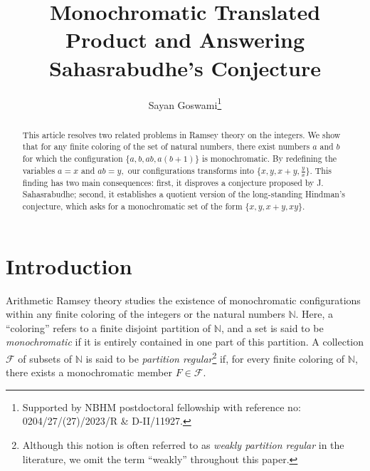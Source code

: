 \documentclass{aic}
\begin{document}
\begin{frontmatter}[classification=text]

\title{Monochromatic Translated Product and Answering Sahasrabudhe's Conjecture} %

\author[SG]{Sayan Goswami\thanks{Supported by  NBHM postdoctoral fellowship with reference no: 0204/27/(27)/2023/R \& D-II/11927.}}

\begin{abstract}
This article resolves two related problems in Ramsey theory on the integers. We show that for any finite coloring of the set of natural numbers, there exist numbers $a$ and $b$ for which the configuration $\{a, b, ab, a(b+1)\}$ is monochromatic. By redefining the variables $a=x$ and $ab=y,$ our configurations transforms into $\{x,y,x+y,\frac{y}{x}\}.$ This finding has two main consequences: first, it disproves a conjecture proposed by J. Sahasrabudhe; second, it establishes a quotient version of the long-standing Hindman's conjecture, which asks for a monochromatic set of the form $\{x,y,x+y,xy\}$. 
\end{abstract}
\end{frontmatter}

\section{Introduction}


Arithmetic Ramsey theory studies the existence of monochromatic configurations within any finite coloring of the integers or the natural numbers \( \mathbb{N} \). Here, a ``coloring'' refers to a finite disjoint partition of \( \mathbb{N} \), and a set is said to be \emph{monochromatic} if it is entirely contained in one part of this partition. A collection \( \mathcal{F} \) of subsets of \( \mathbb{N} \) is said to be \emph{partition regular}\footnote{Although this notion is often referred to as \emph{weakly partition regular} in the literature, we omit the term ``weakly'' throughout this paper.} if, for every finite coloring of \( \mathbb{N} \), there exists a monochromatic member \( F \in \mathcal{F} \).
\end{document}
